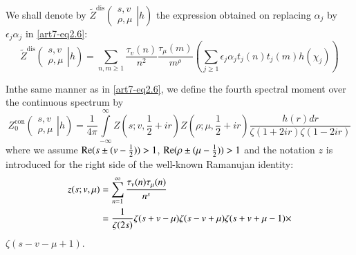 We shall denote by $\tilde{Z}^{\text{dis}} \left(
\left.
\begin{matrix}
s, v\\
\rho, \mu
\end{matrix}
\right| h
\right) $ the expression obtained on replacing $\alpha_j$ by $\epsilon_j \alpha_j$ in \eqref{art7-eq2.6}:
\begin{equation}
\tilde{Z}^{\text{dis}} \left(
\left.
\begin{matrix}
s, v\\
\rho, \mu
\end{matrix}
\right| h
\right)  = \sum\limits_{n,m \geqslant 1} \frac{\tau_v(n)}{n^2} \frac{\tau_\mu(m)}{m^\rho} \left(\sum\limits_{j \geqslant 1} \epsilon_j \alpha_j t_j (n) t_j (m) h(\chi_j) \right) \label{art7-eq2.7}
\end{equation}

In\pageoriginale  the same manner as in \eqref{art7-eq2.6}, we define the fourth spectral moment over the continuous spectrum by
\begin{equation}
Z^{\text{con}}_0 
\left(
\left.
\begin{matrix}
s, v\\
\rho, \mu
\end{matrix}
\right| h
\right)  = \frac{1}{4\pi} \int\limits^\infty_{-\infty} Z (s; v,\frac{1}{2} + ir) Z (\rho ; \mu, \frac{1}{2} + ir) \frac{h(r) dr}{\zeta(1+ 2 ir) \zeta (1-2ir)} \label{art7-eq2.8}
\end{equation}
where we assume $\operatorname{Re} (s \pm (v-\frac{1}{2})) >1$, $\operatorname{Re} (\rho \pm (\mu - \frac{1}{2})) >1$ and the notation $z$ is introduced for the right side of the well-known Ramanujan identity:
\begin{align}
z(s; v, \mu) & = \sum\limits^\infty_{n=1} \frac{\tau_v (n) \tau_\mu (n)}{n^s}\label{art7-eq2.9}\\
& = \frac{1}{\zeta(2s)} \zeta(s+v - \mu) \zeta(s-v+\mu) \zeta (s+v+ \mu-1) \times \notag
\end{align}
$\zeta(s-v-\mu+1)$.


